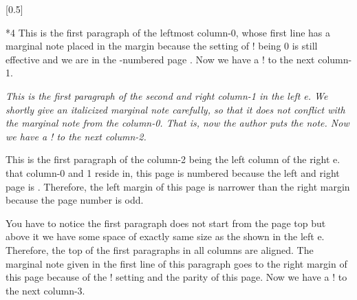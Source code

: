 [0.5]
\par\Hrule
\begin{paracol}[2]*{4}
This is the first paragraph of the leftmost column-0,
whose first line has a marginal note placed in the  margin
because the setting of \!\marginparthreshold! being 0 is still effective
and we are in the -numbered page
\Emph{\pageref{sec:ppts-npaired}}.  Now we have a \!\switchcolumn! to the
next column-1.

\switchcolumn
\begingroup\it
This is the first paragraph of the second and right column-1 in the left
\parapag{}e.  We shortly give an italicized mar\-gin\-al note carefully, so
that it does not conflict with the marginal note from the column-0.
That is, now the author puts the note.  Now we
have a \!\switchcolumn! to the next column-2.
\par\endgroup
{}

\switchcolumn
\begingroup\sf\label{page:ppts-npaired1r}
This is the first paragraph of the column-2 being the left column of the
right \parapag{}e.   that column-0
and 1 reside in, this page is numbered \Emph{\pageref{page:ppts-npaired1r}}
because the left and right page is \Emph{\npaired}.  Therefore, the left
margin of this page is narrower than the right margin because the page
number is odd.


You have to notice
the first paragraph does not start from the page top
but above it we have some space of exactly same size as the \preenv{}
shown in the left \parapag{}e.  Therefore, the top of the first paragraphs
in all columns are aligned.  The marginal note given in the first line of
this paragraph goes to the right margin of this page because of the
\!\marginparthreshold! setting and the parity of this page.  Now we have a
\!\switchcolumn! to the next column-3.
\par\endgroup
{}


\end{paracol}

